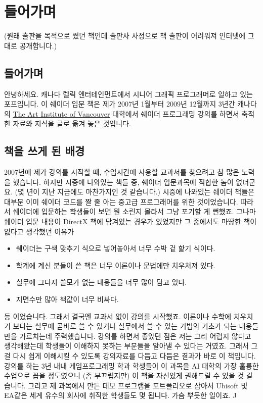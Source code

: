 \section{들어가며}

(원래 출판을 목적으로 썼던 책인데 출판사 사정으로 책 출판이 어려워져 인터넷에 그대로 공개합니다.)

\subsection{들어가며}

안녕하세요. 캐나다 렐릭 엔터테인먼트에서 시니어 그래픽 프로그래머로 일하고 있는 포프입니다. 이 쉐이더 입문 책은 제가 2007년 1월부터 2009년 12월까지 3년간 캐나다의 \href{https://www.artinstitutes.edu/}{The Art Institute of Vancouver} 대학에서 쉐이더 프로그래밍 강의를 하면서 축적한 자료와 지식을 글로 옮겨 놓은 것입니다.

\subsection{책을 쓰게 된 배경}

2007년에 제가 강의를 시작할 때, 수업시간에 사용할 교과서를 찾으려고 참 많은 노력을 했습니다. 하지만 시중에 나와있는 책들 중, 쉐이더 입문과목에 적합한 놈이 없더군요. (몇 년이 지난 지금에도 마찬가지인 것 같습니다.) 시중에 나와있는 쉐이더 책들은 대부분 이미 쉐이더 코드를 짤 줄 아는 중고급 프로그래머를 위한 것이었습니다. 따라서 쉐이더에 입문하는 학생들이 보면 뭔 소린지 몰라서 그냥 포기할 게 뻔했죠. 그나마 쉐이더 입문 내용이 DirectX 책에 담겨있는 경우가 있었지만 그 중에서도 마땅한 책이 없다고 생각했던 이유가
\begin{itemize}
    \item 쉐이더는 구색 맞추기 식으로 넣어놓아서 너무 수박 겉 핥기 식이다.
    \item 학계에 계신 분들이 쓴 책은 너무 이론이나 문법에만 치우쳐져 있다.
    \item 실무에 그다지 쓸모가 없는 내용들을 너무 많이 담고 있다.
    \item 지면수만 많아 책값이 너무 비싸다.
\end{itemize}


등 이었습니다. 그래서 결국엔 교과서 없이 강의를 시작했죠. 이론이나 수학에 치우치기 보다는 실무에 곧바로 쓸 수 있거나 실무에서 쓸 수 있는 기법의 기초가 되는 내용들만을 가르치는데 주력했습니다. 강의를 하면서 좋았던 점은 저는 그리 어렵지 않다고 생각해왔는데 학생들이 이해하지 못하는 부분들을 알아낼 수 있다는 거였죠. 그래서 그걸 다시 쉽게 이해시킬 수 있도록 강의자료를 다듬고 다듬은 결과가 바로 이 책입니다. 강의를 하는 3년 내내 게임프로그래밍 학과 학생들이 이 과목을 AI 대학의 가장 훌륭한 수업으로 꼽을 정도였으니 (좀 부끄럽지만) 이 책을 자신있게 권해드릴 수 있을 것 같습니다. 그리고 제 과목에서 만든 데모 프로그램을 포트폴리오로 삼아서 Ubisoft 및 EA같은 세계 유수의 회사에 취직한 학생들도 몇 됩니다. 가슴 뿌듯한 일이죠. ^^


